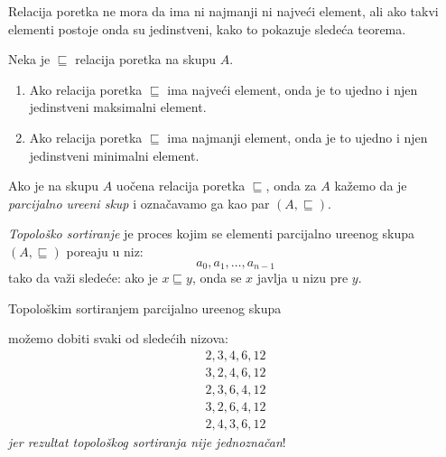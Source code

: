 \bigskip

Relacija poretka ne mora da ima ni najmanji ni najve\'ci element, ali ako takvi elementi postoje onda su jedinstveni,
kako to pokazuje slede\'ca teorema.

\begin{THM}
  Neka je $\sqsubseteq$ relacija poretka na skupu $A$.
  \begin{enumerate}
  \item
    Ako relacija poretka $\sqsubseteq$ ima najve\'ci element, onda je to ujedno i njen jedinstveni maksimalni element.
  \item
    Ako relacija poretka $\sqsubseteq$ ima najmanji element, onda je to ujedno i njen jedinstveni minimalni element.
  \end{enumerate}
\end{THM}

\begin{DEF}
  Ako je na skupu $A$ uo\v cena relacija poretka $\sqsubseteq$, onda za $A$ ka\v zemo da je
  \emph{parcijalno ure\dj eni skup} i ozna\v cavamo ga kao par $(A, \sqsubseteq)$.
  
  \emph{Topolo\v sko sortiranje} je proces kojim se elementi parcijalno ure\dj enog skupa $(A, \sqsubseteq)$
  pore\dj aju u niz:
  $$
    a_0, a_1, \ldots, a_{n-1}
  $$
  tako da va\v zi slede\'ce: ako je $x \sqsubseteq y$, onda se $x$ javlja u nizu pre $y$. 
\end{DEF}

\begin{EX}
Topolo\v skim sortiranjem parcijalno ure\dj enog skupa
\begin{center}
  
\end{center}
mo\v zemo dobiti svaki od slede\'cih nizova:
$$
  \begin{array}{l}
  2, 3, 4, 6, 12\\
  3, 2, 4, 6, 12\\
  2, 3, 6, 4, 12\\
  3, 2, 6, 4, 12\\
  2, 4, 3, 6, 12
  \end{array}
$$
\emph{jer rezultat topolo\v skog sortiranja nije jednozna\v can}!
\end{EX}

